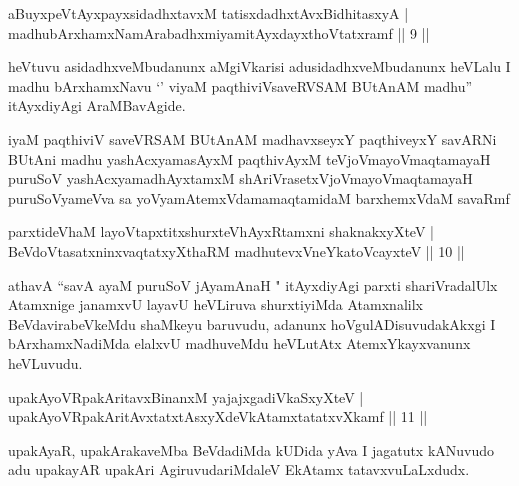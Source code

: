 
\begin{shl}
aBuyxpeVtAyxpayxsidadhxtavxM tatisxdadhxtAvxBidhitasxyA |\\
madhubArxhamxNamArabadhxmiyamitAyxdayxthoVtatxramf \hfill || 9 ||
\end{shl}

\begin{artha}
heVtuvu asidadhxveMbudanunx aMgiVkarisi adusidadhxveMbudanunx heVLalu I madhu bArxhamxNavu `' viyaM paqthiviVsaveRVSAM BUtAnAM madhu'' itAyxdiyAgi AraMBavAgide.
\end{artha}

\centerline{}

\begin{shl}
iyaM paqthiviV saveVRSAM BUtAnAM madhavxseyxY paqthiveyxY savARNi BUtAni madhu yashAcxyamasAyxM paqthivAyxM teVjoVmayoV\s maqtamayaH puruSoV yashAcxyamadhAyxtamxM shAriVrasetxVjoVmayoV\s maqtamayaH puruSoV\s yameVva sa yoV\s yamAtemxVdamamaqtamidaM barxhemxVdaM savaRmf 
\end{shl}



\begin{shl}
parxtideVhaM layoVtapxtitxshurxteVhAyxRtamxni shaknakxyXteV |\\
BeVdoV\s tasatxninxvaqtatxyXthaRM madhutevxVneYkatoVcayxteV \hfill || 10 ||
\end{shl}

\begin{artha}
athavA ``savA ayaM puruSoV jAyamAnaH " itAyxdiyAgi parxti shariVradalUlx Atamxnige janamxvU layavU heVLiruva shurxtiyiMda Atamxnalilx BeVdavirabeVkeMdu shaMkeyu baruvudu, adanunx hoVgulADisuvudakAkxgi I bArxhamxNadiMda elalxvU madhuveMdu heVLutAtx AtemxYkayxvanunx heVLuvudu.
\end{artha}


\begin{shl}
upakAyoVRpakAritavxBinanxM yajajxgadiVkaSxyXteV |\\
upakAyoVRpakAritAvxtatxtAsxyXdeVkAtamxtatatxvXkamf \hfill || 11 ||
\end{shl}

\begin{artha}
upakAyaR, upakArakaveMba BeVdadiMda kUDida yAva I jagatutx kANuvudo adu upakayAR upakAri AgiruvudariMdaleV EkAtamx tatavxvuLaLxdudx.
\end{artha}


